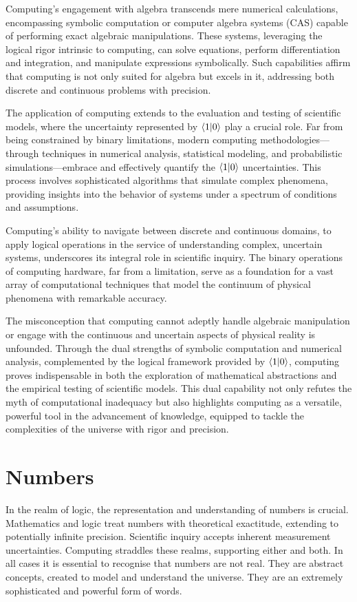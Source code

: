 \documentclass[12pt]{article}
\begin{document}
Computing's engagement with algebra transcends mere numerical calculations, encompassing symbolic computation or computer algebra systems (CAS) capable of performing exact algebraic manipulations. These systems, leveraging the logical rigor intrinsic to computing, can solve equations, perform differentiation and integration, and manipulate expressions symbolically. Such capabilities affirm that computing is not only suited for algebra but excels in it, addressing both discrete and continuous problems with precision.

The application of computing extends to the evaluation and testing of scientific models, where the uncertainty represented by \(\langle 1 | 0 \rangle\) play a crucial role. Far from being constrained by binary limitations, modern computing methodologies—through techniques in numerical analysis, statistical modeling, and probabilistic simulations—embrace and effectively quantify the \(\langle 1 | 0 \rangle\) uncertainties. This process involves sophisticated algorithms that simulate complex phenomena, providing insights into the behavior of systems under a spectrum of conditions and assumptions.

Computing's ability to navigate between discrete and continuous domains, to apply logical operations in the service of understanding complex, uncertain systems, underscores its integral role in scientific inquiry. The binary operations of computing hardware, far from a limitation, serve as a foundation for a vast array of computational techniques that model the continuum of physical phenomena with remarkable accuracy.

The misconception that computing cannot adeptly handle algebraic manipulation or engage with the continuous and uncertain aspects of physical reality is unfounded. Through the dual strengths of symbolic computation and numerical analysis, complemented by the logical framework provided by \(\langle 1 | 0 \rangle\), computing proves indispensable in both the exploration of mathematical abstractions and the empirical testing of scientific models. This dual capability not only refutes the myth of computational inadequacy but also highlights computing as a versatile, powerful tool in the advancement of knowledge, equipped to tackle the complexities of the universe with rigor and precision.

\section*{Numbers}

In the realm of logic, the representation and understanding of numbers is crucial. Mathematics and logic treat numbers with theoretical exactitude, extending to potentially infinite precision. Scientific inquiry accepts inherent measurement uncertainties. Computing straddles these realms, supporting either and both. In all cases it is essential to recognise that numbers are not real. They are abstract concepts, created to model and understand the universe. They are an extremely sophisticated and powerful form of words.
\end{document}
